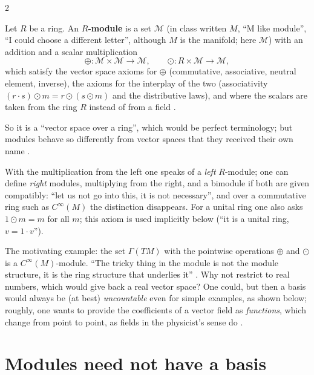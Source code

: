 \begin{paracol}{2}
\begin{definition}\label{def:rm-module}
Let $R$ be a ring. An \textbf{$R$-module} is a set $\mathcal M$ (in class written $M$, ``M like module'', ``I could choose a different letter'', although $M$ is the manifold; here $\mathcal M$) with an addition and a scalar multiplication
\[
  \oplus\colon\mathcal M\times\mathcal M\to\mathcal M,\qquad\odot\colon R\times\mathcal M\to\mathcal M,
\]
which satisfy the vector space axioms for $\oplus$ (commutative, associative, neutral element, inverse), the axioms for the interplay of the two (associativity $(r\cdot s)\odot m=r\odot(s\odot m)$ and the distributive laws), and where the scalars are taken from the ring $R$ instead of from a field      .
\end{definition}
So it is a ``vector space over a ring'', which would be perfect terminology; but modules behave so differently from vector spaces that they received their own name  .
\begin{coursenote}
With the multiplication from the left one speaks of a \emph{left} $R$-module; one can define \emph{right} modules, multiplying from the right, and a bimodule if both are given compatibly: ``let us not go into this, it is not necessary'', and over a commutative ring such as $C^\infty(M)$ the distinction disappears. For a unital ring one also asks $1\odot m=m$ for all $m$; this axiom is used implicitly below
(``it is a unital ring, $v=1\cdot v$'').  
\end{coursenote}
The motivating example: the set $\Gamma(TM)$ with the pointwise operations $\oplus$ and $\odot$ is a $C^\infty(M)$-module. ``The tricky thing in the module is not the module structure, it is the ring structure that underlies it''  .
Why not restrict to real numbers, which would give back a real vector space? One could, but then a basis would always be (at best) \emph{uncountable} even for simple examples, as shown below; roughly, one wants to provide the coefficients of a vector field as \emph{functions}, which change from point to point, as fields in the physicist's sense do    .

\section{Modules need not have a basis}\label{sec:rm-basis}


\end{paracol}
